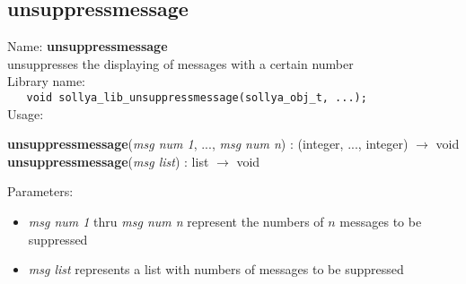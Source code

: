 \subsection{unsuppressmessage}
\label{labunsuppressmessage}
\noindent Name: \textbf{unsuppressmessage}\\
\phantom{aaa}unsuppresses the displaying of messages with a certain number\\[0.2cm]
\noindent Library name:\\
\verb|   void sollya_lib_unsuppressmessage(sollya_obj_t, ...);|\\[0.2cm]
\noindent Usage: 
\begin{center}
\textbf{unsuppressmessage}(\emph{msg num 1}, ..., \emph{msg num n})   : (\textsf{integer}, ..., \textsf{integer}) $\rightarrow$ \textsf{void}\\
\textbf{unsuppressmessage}(\emph{msg list})   : \textsf{list} $\rightarrow$ \textsf{void}\\
\end{center}
Parameters: 
\begin{itemize}
\item \emph{msg num 1} thru \emph{msg num n} represent the numbers of $n$ messages to be suppressed
\item \emph{msg list} represents a list with numbers of messages to be suppressed
\end{itemize}
